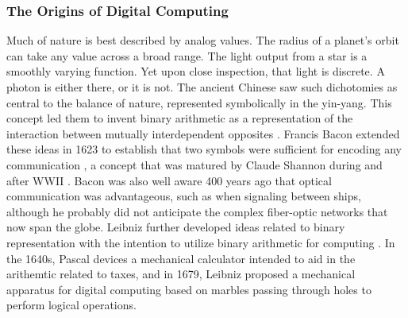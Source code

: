 \documentclass[twocolumn]{article}
\begin{document}
\subsubsection{The Origins of Digital Computing}
Much of nature is best described by analog values. The radius of a planet's orbit can take any value across a broad range. The light output from a star is a smoothly varying function. Yet upon close inspection, that light is discrete. A photon is either there, or it is not. The ancient Chinese saw such dichotomies as central to the balance of nature, represented symbolically in the yin-yang. This concept led them to invent binary arithmetic as a representation of the interaction between mutually interdependent opposites \cite{http://www.atimes.com/leibniz-chinese-invented-first-binary-code/}. Francis Bacon extended these ideas in 1623 to establish that two symbols were sufficient for encoding any communication \cite{dy2012}, a concept that was matured by Claude Shannon during and after WWII \cite{sh1948}. Bacon was also well aware 400 years ago that optical communication was advantageous, such as when signaling between ships, although he probably did not anticipate the complex fiber-optic networks that now span the globe. Leibniz further developed ideas related to binary representation \cite{http://www.leibniz-translations.com/binary.htm} with the intention to utilize binary arithmetic for computing \cite{https://hal.archives-ouvertes.fr/ads-00104781/document,dy2012}. In the 1640s, Pascal devices a mechanical calculator intended to aid in the arithemtic related to taxes, and in 1679, Leibniz proposed a mechanical apparatus for digital computing based on marbles passing through holes to perform logical operations.
\end{document}
